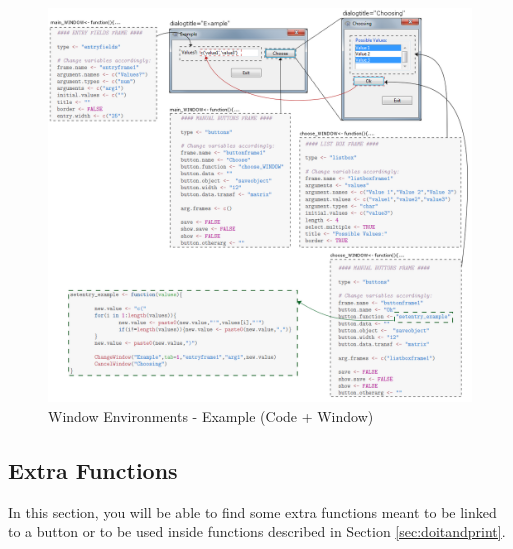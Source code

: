 \documentclass[a4paper]{article}\usepackage[]{graphicx}\usepackage[]{color}
\begin{document}
\begin{figure}[H]
\centering
\includegraphics[width=\linewidth]{figures/windowenvir_example.png}
\caption{Window Environments - Example (Code + Window)\label{windowenvir_example}}
\end{figure}

\newpage

\subsection{Extra Functions}
\noindent In this section, you will be able to find some extra functions meant
to be linked to a button or to be used inside functions described in Section
\ref{sec:doitandprint}.
\end{document}
